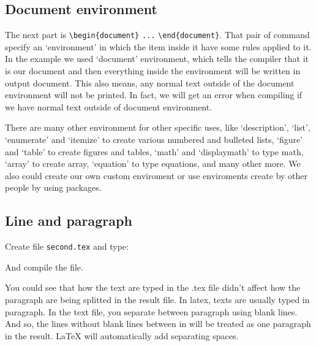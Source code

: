 \documentclass[conference]{IEEEtran}
\begin{document}
\subsection{Document environment}
    The next part is
    \texttt{\textbackslash begin\{document\}}
    \texttt{...}
    \texttt{\textbackslash end\{document\}}.
    That pair of command specify an `environment' in which the item inside it have
    some rules applied to it. In the example we used `document' environment,
    which tells the compiler that it is our document and then everything inside 
    the environment will be written in output document.
    This also means, any normal text outside of the document environment will
    not be printed. In fact, we will get an error when compiling if we have normal
    text outside of document environment. 

    There are many other environment for other specific uses,
    like `description', `list', `enumerate' and `itemize' to create
    various numbered and bulleted lists, `figure' and `table' to
    create figures and tables, `math' and `displaymath' to type math,
    `array' to create array, `equation' to type equations, and many
    other more. We also could create our own custom enviroment or
    use enviroments create by other people by using packages.

\subsection{Line and paragraph}
    Create file \texttt{second.tex} and type:
    
    And compile the file.

    You could see that how the text are typed in the .tex file
    didn't affect how the paragraph are being splitted in the
    result file. In latex, texts are usually typed in paragraph.
    In the text file, you separate between paragraph using blank lines.
    And so, the lines without blank lines between in will be treated
    as one paragraph in the result. LaTeX will automatically add
    separating spaces.
\end{document}
